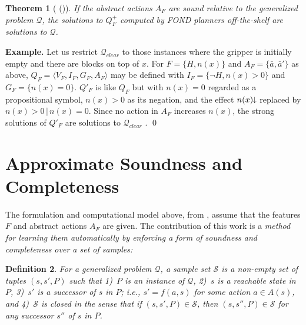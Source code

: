 \documentclass[letterpaper]{article} %
\newcommand{\tup}[1]{\langle #1 \rangle}
\newcommand{\citeay}[1]{\citeauthor{#1} (\citeyear{#1})}
\newtheorem{definition}{Definition}
\newtheorem{theorem}[definition]{Theorem}
\newenvironment{example}{\noindent\textbf{Example.}\xspace}{\qed}
\newcommand{\Q}{\mathcal{Q}}
\renewcommand{\S}{\mathcal{S}}
\newcommand{\mminus}{\hspace{-.05em}\raisebox{.15ex}{\footnotesize$\downarrow$}}
\begin{document}
\begin{theorem}[\citeay{bonet:ijcai2018}]
If the abstract actions  $A_F$ are sound relative to the generalized problem $\Q$, the  solutions  to $Q^+_F$
computed by FOND planners off-the-shelf  are solutions to $\Q$.
\end{theorem}

\medskip
\begin{example}
  Let us restrict  $\Q_{clear}$  to those  instances where  the gripper is initially empty
  and there are blocks on top of $x$. For $F=\{H,n(x)\}$  and $A_F=\{\bar{a},\bar{a}'\}$ as above,
  $Q_F=\tup{V_F,I_F,G_F,A_F}$ may be defined with $I_F=\{\neg H, n(x) > 0\}$ and $G_F=\{n(x)=0\}$.
  $Q'_F$ is like $Q_F$ but with $n(x)=0$ regarded as a propositional symbol, $n(x) > 0$
  as its negation, and the effect $n(x)\mminus$ replaced by  $n(x) > 0 \, | \, n(x)=0$.
  Since  no action in $A_F$ increases $n(x)$, the strong solutions of $Q'_F$
  are solutions to $\Q_{clear}$ \cite{bonet:ijcai2017}.
\end{example}


\section{Approximate Soundness and Completeness}

The formulation and computational model above, from \cite{bonet:ijcai2018},
assume that the features $F$ and abstract actions $A_F$ are given.
The contribution of this work is a \emph{method for  learning   them automatically
by enforcing a form of soundness and completeness over a set of samples:}

\begin{definition}
  For a generalized problem $\Q$, a \emph{sample set}  $\S$ is a non-empty set of tuples  $(s,s',P)$
  such that 1)~$P$ is an instance of $\Q$, 2)~$s$ is a reachable state in $P$, 3)~$s'$
  is a successor of $s$ in $P$; i.e., $s'=f(a,s)$ for some action $a \in A(s)$,
  and
  4)~$\S$ is closed in the sense  that if $(s,s',P) \in \S$, then $(s,s'',P) \in \S$  for any successor $s''$
  of $s$ in $P$.
\end{definition}
\end{document}
